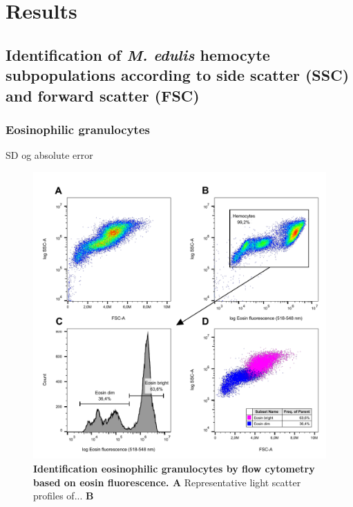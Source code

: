 \chapter{Results}
\label{chap:results}
\section{Identification of \emph{M. edulis} hemocyte subpopulations according to side scatter (SSC) and forward scatter (FSC)}
\subsection{Eosinophilic granulocytes}


SD og absolute error


\begin{figure}[!ht]
    \centering
    \includegraphics[width=1.0\textwidth]{figures/Eosin and Percoll exp/Eosin exp pool ex for Incskape test.pdf}
    \caption{\textbf{Identification eosinophilic granulocytes by flow cytometry based on eosin fluorescence. A} Representative light scatter profiles of... \textbf{B} }
    \label{fig:eosin_exp}
\end{figure}




